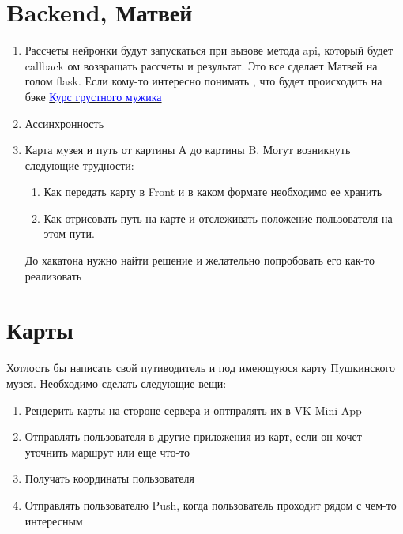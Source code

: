 \documentclass[11pt]{article}
\begin{document}
\section{Backend, {Матвей}}

\begin{enumerate}

\item Рассчеты нейронки будут запускаться при вызове метода api, который будет callback ом возвращать рассчеты и результат. Это все сделает Матвей на голом flask. Если кому-то интересно понимать , что будет происходить на бэке \href{https://blog.miguelgrinberg.com/post/the-flask-mega-tutorial-part-i-hello-world}{\textcolor{blue}{Курс грустного мужика}}
\item Ассинхронность 
\item Карта музея и путь от картины А до картины B. Могут возникнуть следующие трудности:
\begin{enumerate}
\item Как передать карту в Front и в каком формате необходимо ее хранить 
\item Как отрисовать путь на карте и отслеживать положение пользователя на этом пути. 
\end{enumerate}
До хакатона нужно найти решение и желательно попробовать его как-то реализовать
\end{enumerate}

\section{Карты}

Хотлость бы написать свой путиводитель и под имеющуюся карту Пушкинского музея. Необходимо сделать следующие вещи:
\begin{enumerate}

\item Рендерить карты на стороне сервера и оптпралять их в VK Mini App

\item Отправлять пользователя в другие приложения из карт, если он хочет уточнить маршрут или еще что-то

\item Получать координаты пользователя

\item Отправлять пользователю Push, когда пользователь проходит рядом с чем-то интересным

\end{enumerate}
\end{document}
